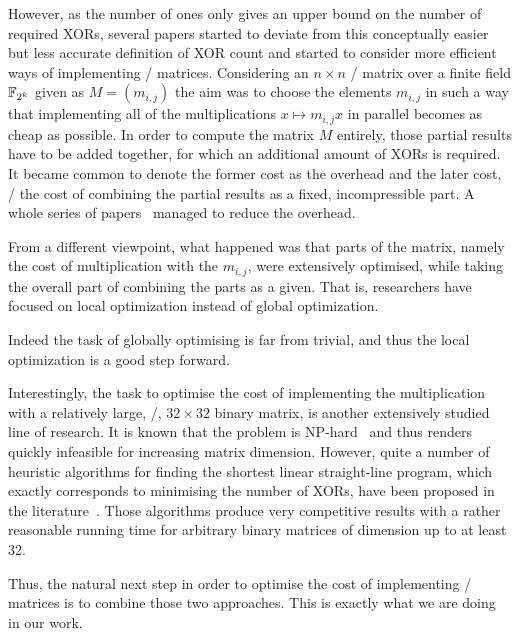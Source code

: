 However, as the number of ones only gives an upper bound on the number of required XORs, several papers started to deviate from this conceptually easier but less accurate definition of XOR count and started to consider more efficient ways of implementing \MDS/ matrices.
Considering an $n\times n$ \MDS/ matrix over a finite field $\mathbb{F}_{2^k}$ given as $M=(m_{i,j})$ the aim was to choose the elements $m_{i,j}$ in such a way that implementing all of the multiplications $x \mapsto m_{i,j} x$ in parallel becomes as cheap as possible.
In order to compute the matrix $M$ entirely, those partial results have to be added together, for which an additional amount of XORs is required.
It became common to denote the former cost as the overhead and the later cost, \ie/ the cost of combining the partial results as a fixed, incompressible part.
A whole series of papers~ managed to reduce the overhead.

From a different viewpoint, what happened was that parts of the matrix, namely the cost of multiplication with the $m_{i,j}$, were extensively optimised, while taking the overall part of combining the parts as a given.
That is, researchers have focused on local optimization instead of global optimization.

Indeed the task of globally optimising is far from trivial, and thus the local optimization is a good step forward.

Interestingly, the task to optimise the cost of implementing the multiplication with a relatively large, \eg/, $32 \times 32$ binary matrix, is another extensively studied line of research.
It is known that the problem is NP-hard~\cite{JC:BoyMatPer13,MFCS:BoyMatPer08} and thus renders quickly infeasible for increasing matrix dimension.
However, quite a number of heuristic algorithms for finding the shortest linear straight-line program, which exactly corresponds to minimising the number of XORs, have been proposed in the literature~.
Those algorithms produce very competitive results with a rather reasonable running time for arbitrary binary matrices of dimension up to at least 32.

Thus, the natural next step in order to optimise the cost of implementing \MDS/ matrices is to combine those two approaches.
This is exactly what we are doing in our work.

